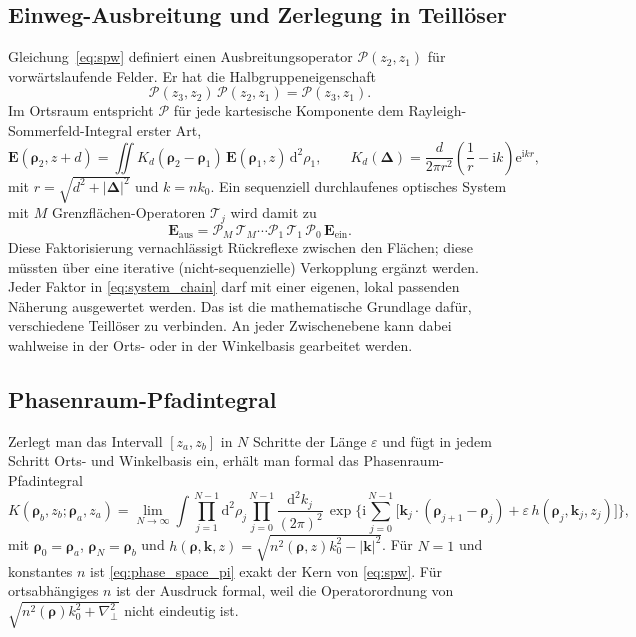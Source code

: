 \documentclass[11pt,a4paper]{scrartcl}
\theoremstyle{insightstyle}
\newcommand{\dd}{\mathrm{d}}
\newcommand{\ii}{\mathrm{i}}
\newcommand{\ee}{\mathrm{e}}
\newcommand{\rh}{\bm{\rho}}
\begin{document}
\subsection{Einweg-Ausbreitung und Zerlegung in Teillöser}
Gleichung~\eqref{eq:spw} definiert einen Ausbreitungsoperator $\mathcal P(z_2,z_1)$ für vorwärtslaufende Felder. Er hat die Halbgruppeneigenschaft
\begin{equation}
    \mathcal P(z_3,z_2)\,\mathcal P(z_2,z_1) = \mathcal P(z_3,z_1).
\end{equation}
Im Ortsraum entspricht $\mathcal P$ für jede kartesische Komponente dem Rayleigh-Sommerfeld-Integral erster Art,
\begin{equation}
    \bm E(\rh_2,z+d) = \iint K_d(\rh_2-\rh_1)\,\bm E(\rh_1,z)\,\dd^2\rho_1,
    \qquad
    K_d(\bm\Delta) = \frac{d}{2\pi r^2}\left(\frac1r-\ii k\right)\ee^{\ii kr},
    \label{eq:rs_kernel}
\end{equation}
mit $r=\sqrt{d^2+|\bm\Delta|^2}$ und $k=nk_0$. Ein sequenziell durchlaufenes optisches System mit $M$ Grenzflächen-Operatoren $\mathcal T_j$ wird damit zu
\begin{equation}
    \bm E_\text{aus} = \mathcal P_M\,\mathcal T_M\cdots\mathcal P_1\,\mathcal T_1\,\mathcal P_0\,\bm E_\text{ein}.
    \label{eq:system_chain}
\end{equation}
Diese Faktorisierung vernachlässigt Rückreflexe zwischen den Flächen; diese müssten über eine iterative (nicht-sequenzielle) Verkopplung ergänzt werden. Jeder Faktor in \eqref{eq:system_chain} darf mit einer eigenen, lokal passenden Näherung ausgewertet werden. Das ist die mathematische Grundlage dafür, verschiedene Teillöser zu verbinden. An jeder Zwischenebene kann dabei wahlweise in der Orts- oder in der Winkelbasis gearbeitet werden.

\subsection{Phasenraum-Pfadintegral}
Zerlegt man das Intervall $[z_a,z_b]$ in $N$ Schritte der Länge $\varepsilon$ und fügt in jedem Schritt Orts- und Winkelbasis ein, erhält man formal das Phasenraum-Pfadintegral
\begin{equation}
    K(\rh_b,z_b;\rh_a,z_a) = \lim_{N\to\infty}\int\prod_{j=1}^{N-1}\dd^2\rho_j\prod_{j=0}^{N-1}\frac{\dd^2k_j}{(2\pi)^2}\,
    \exp\!\Big\{\ii\sum_{j=0}^{N-1}\big[\bm k_j\cdot(\rh_{j+1}-\rh_j)+\varepsilon\,h(\rh_j,\bm k_j,z_j)\big]\Big\},
    \label{eq:phase_space_pi}
\end{equation}
mit $\rh_0=\rh_a$, $\rh_N=\rh_b$ und $h(\rh,\bm k,z)=\sqrt{n^2(\rh,z)k_0^2-|\bm k|^2}$. Für $N=1$ und konstantes $n$ ist \eqref{eq:phase_space_pi} exakt der Kern von \eqref{eq:spw}. Für ortsabhängiges $n$ ist der Ausdruck formal, weil die Operatorordnung von $\sqrt{n^2(\rh)k_0^2+\nabla_\perp^2}$ nicht eindeutig ist.
\end{document}

